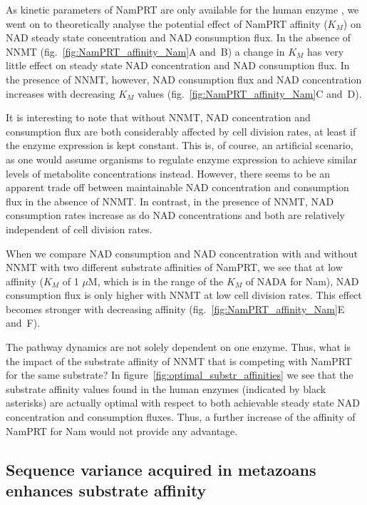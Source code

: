 As kinetic parameters of NamPRT are only available for the human enzyme \cite{Burgos2008}, we went on to theoretically analyse the potential effect of NamPRT affinity ($K_{M}$) on NAD steady state concentration and NAD consumption flux. In the absence of NNMT (fig.~\ref{fig:NamPRT_affinity_Nam}A and~B) a change in $K_{M}$ has very little effect on steady state NAD concentration and NAD consumption flux. In the presence of NNMT, however, NAD consumption flux and NAD concentration increases with decreasing $K_{M}$ values (fig.~\ref{fig:NamPRT_affinity_Nam}C and~D).

It is interesting to note that without NNMT, NAD concentration and consumption flux are both considerably affected by cell division rates, at least if the enzyme expression is kept constant. This is, of course, an artificial scenario, as one would assume organisms to regulate enzyme expression to achieve similar levels of metabolite concentrations instead. However, there seems to be an apparent trade off between maintainable NAD concentration and consumption flux in the absence of NNMT. In contrast, in the presence of NNMT, NAD consumption rates increase as do NAD concentrations and both are relatively independent of cell division rates.

When we compare NAD consumption and NAD concentration with and without NNMT with two different substrate affinities of NamPRT, we see that at low affinity ($K_{M}$ of 1 $\mu$M, which is in the range of the $K_{M}$ of NADA for Nam), NAD consumption flux is only higher with NNMT at low cell division rates. This effect becomes stronger with decreasing affinity (fig.~\ref{fig:NamPRT_affinity_Nam}E and~F).

The pathway dynamics are not solely dependent on one enzyme. Thus, what is the impact of the substrate affinity of NNMT that is competing with NamPRT for the same substrate? In figure~\ref{fig:optimal_substr_affinities} we see that the substrate affinity values found in the human enzymes (indicated by black asterisks) are actually optimal with respect to both achievable steady state NAD concentration and consumption fluxes. Thus, a further increase of the affinity of NamPRT for Nam would not provide any advantage.


\subsection{Sequence variance acquired in metazoans enhances substrate affinity}

